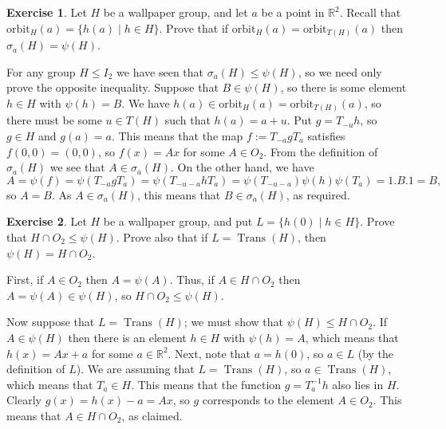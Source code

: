\documentclass{amsart}
\DeclareMathOperator{\Trans}{Trans}
\renewcommand{\:}{\colon}
\newcommand{\st}{\;|\;}
\newcommand{\R}{\mathbb{R}}
\newcommand{\sg}        {\sigma}
\theoremstyle{definition}
\newtheorem{exercise}{Exercise}
\newenvironment{solution}{{\noindent\bf Solution:}}{}
\begin{document}
\begin{exercise}
 Let $H$ be a wallpaper group, and let $a$ be a point in $\R^2$.
 Recall that $\text{orbit}_H(a)=\{h(a)\st h\in H\}$.  Prove that if
 $\text{orbit}_H(a)=\text{orbit}_{T(H)}(a)$ then $\sg_a(H)=\psi(H)$.
\end{exercise}
\begin{solution}
 For any group $H\leq I_2$ we have seen that $\sg_a(H)\leq\psi(H)$, so
 we need only prove the opposite inequality.  Suppose that
 $B\in\psi(H)$, so there is some element $h\in H$ with $\psi(h)=B$.
 We have $h(a)\in \text{orbit}_H(a)=\text{orbit}_{T(H)}(a)$, so there
 must be some $u\in T(H)$ such that $h(a)=a+u$.  Put $g=T_{-u}h$,
 so $g\in H$ and $g(a)=a$.  This means that the map $f:=T_{-a}gT_a$
 satisfies $f(0,0)=(0,0)$, so $f(x)=Ax$ for some $A\in O_2$.  From the
 definition of $\sg_a(H)$ we see that $A\in\sg_a(H)$.  On the other
 hand, we have 
 \[ A = \psi(f) = \psi(T_{-a}gT_a) = \psi(T_{-u-a}hT_a) =
    \psi(T_{-u-a})\psi(h)\psi(T_a) = 1.B.1 = B,
 \] 
 so $A=B$.  As $A\in\sg_a(H)$, this means that $B\in\sg_a(H)$, as
 required. 
\end{solution}

\begin{exercise}
 Let $H$ be a wallpaper group, and put $L=\{h(0)\st h\in H\}$.  Prove
 that $H\cap O_2\leq\psi(H)$.  Prove also that if $L=\Trans(H)$, then
 $\psi(H)=H\cap O_2$. 
\end{exercise}
\begin{solution}
 First, if $A\in O_2$ then $A=\psi(A)$.  Thus, if $A\in H\cap O_2$
 then $A=\psi(A)\in\psi(H)$, so $H\cap O_2\leq\psi(H)$.
 
 Now suppose that $L=\Trans(H)$; we must show that
 $\psi(H)\leq H\cap O_2$.  If $A\in\psi(H)$ then there is an element
 $h\in H$ with $\psi(h)=A$, which means that $h(x)=Ax+a$ for some
 $a\in\R^2$.  Next, note that $a=h(0)$, so $a\in L$ (by the definition
 of $L$).  We are assuming that $L=\Trans(H)$, so $a\in\Trans(H)$,
 which means that $T_a\in H$.  This means that the function
 $g=T_a^{-1}h$ also lies in $H$.  Clearly $g(x)=h(x)-a=Ax$, so $g$
 corresponds to the element $A\in O_2$.  This means that
 $A\in H\cap O_2$, as claimed.
\end{solution}
\end{document}
